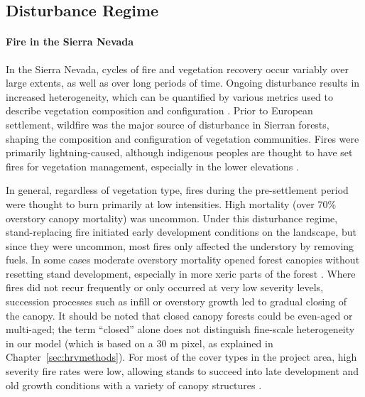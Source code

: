 \subsection{Disturbance Regime}
\paragraph{Fire in the Sierra Nevada}
In the Sierra Nevada, cycles of fire and vegetation recovery occur variably over large extents, as well as over long periods of time. Ongoing disturbance results in increased heterogeneity, which can be quantified by various metrics used to describe vegetation composition and configuration \citep{Monica2008}. Prior to European settlement, wildfire was the major source of disturbance in Sierran forests, shaping the composition and configuration of vegetation communities. Fires were primarily lightning-caused, although indigenous peoples are thought to have set fires for vegetation management, especially in the lower elevations \citep{Safford2013}. 

In general, regardless of vegetation type, fires during the pre-settlement period were thought to burn primarily at low intensities. High mortality (over 70\% overstory canopy mortality) was uncommon. Under this disturbance regime, stand-replacing fire initiated early development conditions on the landscape, but since they were uncommon, most fires only affected the understory by removing fuels. In some cases moderate overstory mortality opened forest canopies without resetting stand development, especially in more xeric parts of the forest \citep{Mallek2013,Safford2014,SNEP1996a,SNEP1996}. Where fires did not recur frequently or only occurred at very low severity levels, succession processes such as infill or overstory growth led to gradual closing of the canopy. It should be noted that closed canopy forests could be even-aged or multi-aged; the term ``closed'' alone does not distinguish fine-scale heterogeneity in our model (which is based on a 30 m pixel, as explained in Chapter~\ref{sec:hrvmethods}). For most of the cover types in the project area, high severity fire rates were low, allowing stands to succeed into late development and old growth conditions with a variety of canopy structures \citep{Mallek2013,Safford2014,SNEP1996a,SNEP1996}. 

